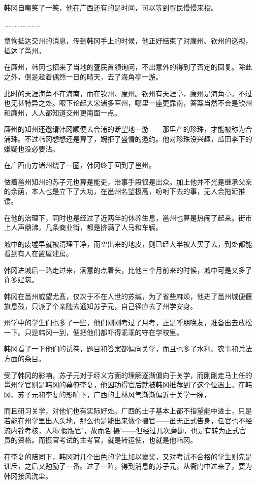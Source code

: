 韩冈自嘲笑了一笑，他在广西还有的是时间，可以等到疍民慢慢来投。

……………………

章恂抵达交州的消息，传到韩冈手上的时候，他正好结束了对廉州、钦州的巡视，抵达了邕州。

在廉州，韩冈也招来了当地的疍民首领询问，不出意外的得到了否定的回复。除此之外，倒是趁着偶然一日的晴天，去了海角亭一游。

此时的天涯海角不在海南，而在钦州、廉州。钦州有天涯亭，廉州是海角亭。不过也无甚特异之处。眼下论起大宋诸多军州，哪里一座更靠南，答案当然不会是钦州和廉州，人人都知道交州更南面一点。

廉州的知州还邀请韩冈顺便去合浦的断望地一游——那里产的珍珠，才能被称为合浦珠。不过韩冈想想还是算了，婉拒了盛情的邀约。他对珍珠没兴趣，瓜田李下的嫌疑也没必要沾。

在广西南方诸州绕了一圈，韩冈终于回到了邕州。

做着邕州知州的苏子元也算是能吏，治事手段很是出众。加上他并不光是继承父亲的余荫，本人也是立下了大功，在邕州名望极高，吩咐下去的事，无人会拖延推诿。

在他的治理下，同时也是经过了近两年的休养生息，邕州也算是热闹了起来。街市上人声鼎沸，几条商业街，都是挤满了人马和车辆。

城中的废墟早就被清理干净，而空出来的地皮，则已经大半被人买了去，到处都能看到有人在置屋建房。

韩冈进城后一路走过来，满意的点着头，比他三个月前来的时候，城中可是又多了许多建筑。

韩冈在邕州威望尤髙，仅次于不在人世的苏缄，为了省些麻烦，他进了邕州城便偃旗息鼓，只派了个亲随去通知苏子元，自己径直去了州学安身。

州学中的学生们也多了一些，他们刚刚考过了月考，正是呼朋唤友，准备出去放松一下。只是韩冈一到，便把他们都吓得乖乖的守在学校里。

韩冈看了一下他们的试卷，题目和答案都偏向关学，而且也多了水利、农事和兵法方面的条目。

受了韩冈的影响，苏子元对于经义方面的理解逐渐偏向于关学，而刚刚走马上任的邕州学官则是韩冈的幕僚李复，他因功得官后就被韩冈推荐到了这个位置上。在韩冈、苏子元和李复的影响下，广西的士林风气渐渐偏近于关学一脉，

而且研习关学，对他们也有实际好处。广西的士子基本上都不指望能中进士，只是若能在州学里出人头地，那么也是能出来做个摄官——虽无正式告身，任官也不经流内铨考核，人称‘假版官’，故而名‘摄’——但经过几次磨勘，也是有转为正式官员的资格。而摄官考试的主考官，就是转运使，也就是他韩冈。

在李复的陪同下，韩冈对几个出色的学生加以褒奖，又对考试不合格的学生则先是训斥，之后又勉励了一番。过了一阵，得到消息的苏子元，从衙门中过来了，要为韩冈接风洗尘。

